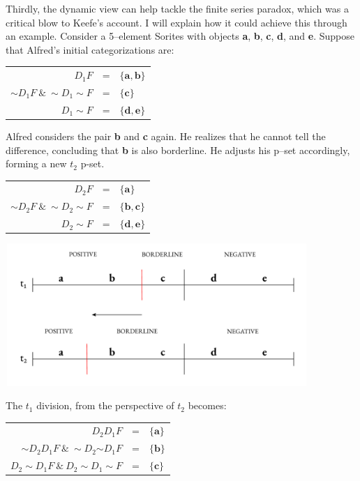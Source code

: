 Thirdly, the dynamic view can help tackle the finite series paradox,
which was a critical blow to Keefe's account. I will explain how it
could achieve this through an example. Consider a 5--element Sorites with
objects \textbf{a}, \textbf{b}, \textbf{c}, \textbf{d}, and \textbf{e}.
Suppose that Alfred's initial categorizations are:

\begin{center}
\begin{tabulary}{\textwidth}{RCL}
$D_1 F$ & = & $\{ \mathbf{a}, \mathbf{b} \}$ \\
${\sim}D_1 F \ \& \ {\sim}D_1{\sim}F$ & = & $\{ \mathbf{c} \}$ \\
$D_{1}{\sim}F$ & = & $\{ \mathbf{d}, \mathbf{e}\}$ \\
\end{tabulary}
\end{center}
Alfred considers the pair \textbf{b} and \textbf{c} again. He realizes
that he cannot tell the difference, concluding that \textbf{b} is also
borderline. He adjusts his p--set accordingly, forming a new \(t_{2}\)
p-set.

\begin{center}
\begin{tabulary}{\textwidth}{RCL}
$D_2 F$ & = & $\{ \mathbf{a} \}$ \\
${\sim} D_2 F \ \& \ {\sim}D_2 {\sim}F$ & = & $\{ \mathbf{b}, \mathbf{c} \}$ \\
$D_2 {\sim}F$ & = & $\{ \mathbf{d}, \mathbf{e} \}$
\end{tabulary}
\end{center}

\begin{center}
\includegraphics[width=4.50937in,height=2.12793in]{papers/figures/2-3.pdf}
 \end{center}
The $t_{1}$ division, from the perspective of $t_{2}$ becomes:

\begin{center}
\begin{tabulary}{\textwidth}{RCL}
$D_2 D_1 F$ & = & $\{ \mathbf{a} \}$ \\
${\sim} D_2 D_1 F \ \& \ {\sim}D_{2}{{\sim}D}_{1}F$ & = & $\{ \mathbf{b} \}$ \\
$D_{2}{\sim}D_{1}F\ \&\ D_{2}{\sim}D_{1}{\sim}F $ & = & $\{ \mathbf{c} \}$
\end{tabulary}
\end{center}


